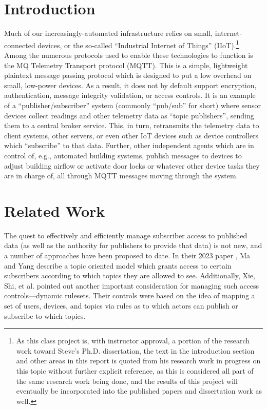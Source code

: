 \documentclass[sigconf, nonacm]{acmart}
\begin{document}
\section{Introduction}
Much of our increasingly-automated infrastructure relies on small, internet-connected devices, or the so-called ``Industrial Internet of Things'' (IIoT).\footnote{As this class project is, with instructor approval, a portion
of the research work toward Steve's Ph.D. dissertation, the text in the introduction section and other areas in this report is quoted from his research work in progress on this topic without further explicit reference, as this is considered all part of the same research work being done, and the results of this project will eventually be incorporated into the published papers and dissertation work as well.}
Among the numerous protocols used to enable these technologies to function is the MQ Telemetry Transport protocol (MQTT). This is a simple,
lightweight plaintext message passing protocol which is designed to put a low overhead on small, low-power devices. As a result, it does not by default
support encryption, authentication, message integrity validation, or access controls. It is an example of a ``publisher/subscriber'' system 
(commonly ``pub/sub'' for short) where sensor devices collect readings and other telemetry data as ``topic publishers'', sending them to a central broker service. This, in turn, retransmits the telemetry data to client systems, other servers, or even other IoT devices such as device controllers which
``subscribe'' to that data. Further, other independent agents which are in control of, e.g., automated building systems, publish messages to devices to adjust
building airflow or activate door locks or whatever other device tasks they are in charge of, all through MQTT messages moving through the system.

\section{Related Work}
The quest to effectively and efficiently manage subscriber access to published data (as well as the authority for publishers to provide that
data) is not new, and a number of approaches have been proposed to date. In their 2023 paper \cite{ma2022tbac}, Ma and Yang describe a topic
oriented model which grants access to certain subscribers according to which topics they are allowed to see.  Additionally, Xie, Shi, et al. pointed
out \cite{xie2020topic} another important consideration for managing such access controls---dynamic rulesets. Their controls were based on the idea
of mapping a set of users, devices, and topics via rules as to which actors can publish or subscribe to which topics.
\end{document}
